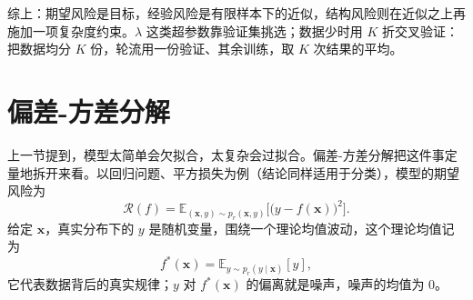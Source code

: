 \documentclass[UTF8,a4paper,12pt]{ctexart}
\numberwithin{equation}{section}
\begin{document}
综上：期望风险是目标，经验风险是有限样本下的近似，结构风险则在近似之上再施加一项复杂度约束。$\lambda$ 这类超参数靠验证集挑选；数据少时用 $K$ 折交叉验证：把数据均分 $K$ 份，轮流用一份验证、其余训练，取 $K$ 次结果的平均。

\section{偏差-方差分解}

上一节提到，模型太简单会欠拟合，太复杂会过拟合。偏差-方差分解把这件事定量地拆开来看。以回归问题、平方损失为例（结论同样适用于分类），模型的期望风险为
\begin{equation}\label{eq:3.1}
\mathcal{R}(f)
=\mathbb{E}_{(\bm{x},y)\sim p_r(\bm{x},y)}\bigl[\bigl(y-f(\bm{x})\bigr)^{2}\bigr].
\end{equation}
给定 $\bm{x}$，真实分布下的 $y$ 是随机变量，围绕一个理论均值波动，这个理论均值记为
\begin{equation}\label{eq:3.2}
f^{*}(\bm{x})=\mathbb{E}_{y\sim p_r(y\mid\bm{x})}[y],
\end{equation}
它代表数据背后的真实规律；$y$ 对 $f^{*}(\bm{x})$ 的偏离就是噪声，噪声的均值为 $0$。
\end{document}
